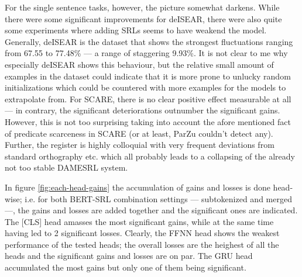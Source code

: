 For the single sentence tasks, however, the picture somewhat darkens. While there were some
significant improvements for deISEAR, there were also quite some experiments where adding SRLs
seems to have weakend the model. Generally, deISEAR is the dataset that shows the strongest
fluctuations ranging from 67.55 to 77.48\% --- a range of staggering 9.93\%. It is not clear
to me why especially deISEAR shows this behaviour, but the relative small amount of examples
in the dataset could indicate that it is more prone to unlucky random initializations which
could be countered with more examples for the models to extrapolate from.
For SCARE, there is no clear positive effect measurable at all
--- in contrary, the significant deteriorations outnumber the significant gains. However, this
is not too surprising taking into account the afore mentioned fact of predicate scarceness in
SCARE (or at least, ParZu couldn't detect any). Further, the register is highly colloquial with
very frequent deviations from standard orthography etc. which all probably leads to a collapsing
of the already not too stable DAMESRL system.



In figure \ref{fig:each-head-gains} the accumulation of gains and losses is done head-wise; i.e.
for both BERT-SRL combination settings --- subtokenized and merged ---, the gains and losses
are added together and the significant ones are indicated. The [CLS] head amasses the most
significant gains, while at the same time having led to 2 significant losses.
Clearly, the FFNN head shows the weakest performance of the tested heads; the overall losses are the heighest
of all the heads and the significant gains and losses are on par. The GRU head accumulated the
most gains but only one of them being significant.


